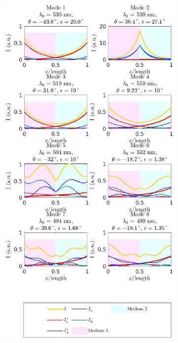 \begin{figure}
\begin{subfigure}{0.49\textwidth}
\begin{subfigure}{\textwidth}
			\caption{}
			\label{fig:defect_cavity:modes_found}
		\end{subfigure}
	\end{subfigure}
	\begin{subfigure}{0.49\textwidth}
		\includegraphics[width=\textwidth]{plots/defect/intensity_distribution}

\end{subfigure}
\end{figure}
